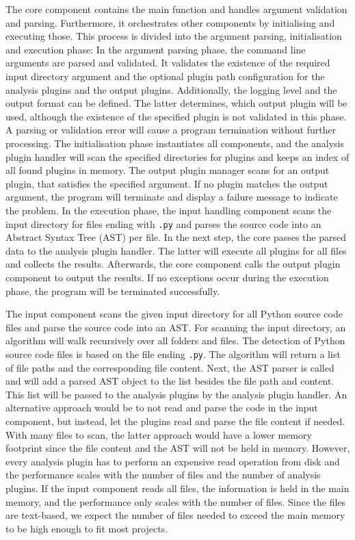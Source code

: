 The core component contains the main function and handles argument validation and parsing. Furthermore, it orchestrates other components by initialising and executing those. This process is divided into the argument parsing, initialisation and execution phase:
In the argument parsing phase, the command line arguments are parsed and validated. It validates the existence of the required input directory argument and the optional plugin path configuration for the analysis plugins and the output plugins. Additionally, the logging level and the output format can be defined. The latter determines, which output plugin will be used, although the existence of the specified plugin is not validated in this phase. A parsing or validation error will cause a program termination without further processing.
The initialisation phase instantiates all components, and the analysis plugin handler will scan the specified directories for plugins and keeps an index of all found plugins in memory. The output plugin manager scans for an output plugin, that satisfies the specified argument. If no plugin matches the output argument, the program will terminate and display a failure message to indicate the problem.
In the execution phase, the input handling component scans the input directory for files ending with \texttt{.py} and parses the source code into an Abstract Syntax Tree (AST) per file. In the next step, the core passes the parsed data to the analysis plugin handler. The latter will execute all plugins for all files and collects the results. Afterwards, the core component calls the output plugin component to output the results. If no exceptions occur during the execution phase, the program will be terminated successfully.

The input component scans the given input directory for all Python source code files and parse the source code into an AST. 
For scanning the input directory, an algorithm will walk recursively over all folders and files. The detection of Python source code files is based on the file ending \texttt{.py}. The algorithm will return a list of file paths and the corresponding file content. 
Next, the AST parser is called and will add a parsed AST object to the list besides the file path and content. This list will be passed to the analysis plugins by the analysis plugin handler.  An alternative approach would be to not read and parse the code in the input component, but instead, let the plugins read and parse the file content if needed. With many files to scan, the latter approach would have a lower memory footprint since the file content and the AST will not be held in memory. However, every analysis plugin has to perform an expensive read operation from disk and the performance scales with the number of files and the number of analysis plugins. 
If the input component reads all files, the information is held in the main memory, and the performance only scales with the number of files. Since the files are text-based, we expect the number of files needed to exceed the main memory to be high enough to fit most projects.

